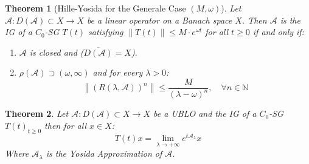 \documentclass[12pt, oneside]{book}
\newtheorem{theo}{Theorem}[section]
\newcommand{\norm}[1]{\left\lVert#1\right\rVert}
\newcommand{\A}{\mathscr{A}}
\begin{document}
\begin{theo}[Hille-Yosida for the Generale Case $(M, \omega)$] \label{thm:hy_mo}
	Let $\A: D(\A) \subset X \to X$ be a linear operator on a Banach space $X$. Then $\A$ is the IG of a $C_0$-SG $T(t)$ satisfying $\norm{T(t)} \le M\cdot e^{\omega t}$ for all $t \ge 0$ if and only if:
\begin{enumerate}[label=(\roman*)]
	\item $\A$ is closed and ($\overline{D(\A)} = X$).
	\item $\rho(\A) \supset (\omega, \infty)$ and for every $\lambda > 0$:
    $$
    \norm{(R(\lambda, \A))^n} \le \frac{M}{(\lambda - \omega)^n}, \quad \forall n \in \mathbb{N}
    $$
\end{enumerate}
\end{theo}

\begin{theo}
	Let $\A: D(\A) \subset X \to X$ be a UBLO and the IG of a $C_0$-SG $T(t)_{t \ge 0}$ then for all $x \in X$:
	$$
	T(t)x = \lim_{\lambda \to +\infty}{e^{t\A_{\lambda}}x}
	$$
	Where $\A_{\lambda}$ is the Yosida Approximation of $\A$.
\end{theo}
\end{document}
